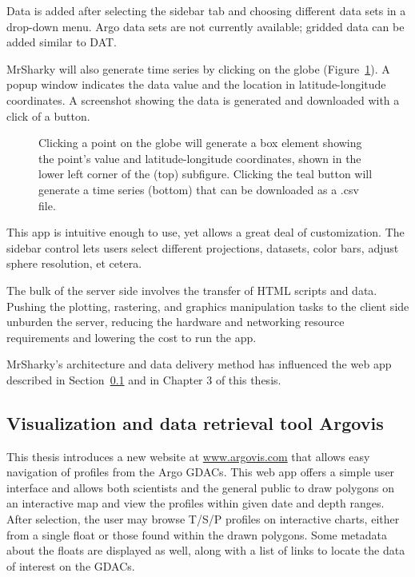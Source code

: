 Data is added after selecting the sidebar tab and choosing different data sets in a drop-down menu. Argo data sets are not currently available; gridded data can be added similar to DAT. 

MrSharky will also generate time series by clicking on the globe (Figure~\ref{fig:mr_sh_south}). A popup window indicates the data value and the location in latitude-longitude coordinates. A screenshot showing the data is generated and downloaded with a click of a button. 

\begin{figure}
\begin{minipage}{6in}
\centering
{}
\caption{\label{fig:mr_sh_south} Clicking a point on the globe will generate a box element showing the point's value and latitude-longitude coordinates, shown in the lower left corner of the (top) subfigure. Clicking the teal button will generate a time series (bottom) that can be downloaded as a .csv file.}
\end{minipage}
\end{figure}

This app is intuitive enough to use, yet allows a great deal of customization. The sidebar control lets users select different projections, datasets, color bars, adjust sphere resolution, et cetera.

The bulk of the server side involves the transfer of HTML scripts and data\cite{pierret20174d}. Pushing the plotting, rastering, and graphics manipulation tasks to the client side unburden the server, reducing the hardware and networking resource requirements and lowering the cost to run the app. 

MrSharky's architecture and data delivery method has influenced the web app described in Section~\ref{argovis} and in Chapter 3 of this thesis.

\subsection{Visualization and data retrieval tool Argovis} \label{argovis}

This thesis introduces a new website at \url{www.argovis.com} that allows easy navigation of profiles from the Argo GDACs. This web app offers a simple user interface and allows both scientists and the general public to draw polygons on an interactive map and view the profiles within given date and depth ranges. After selection, the user may browse T/S/P profiles on interactive charts, either from a single float or those found within the drawn polygons. Some metadata about the floats are displayed as well, along with a list of links to locate the data of interest on the GDACs.

